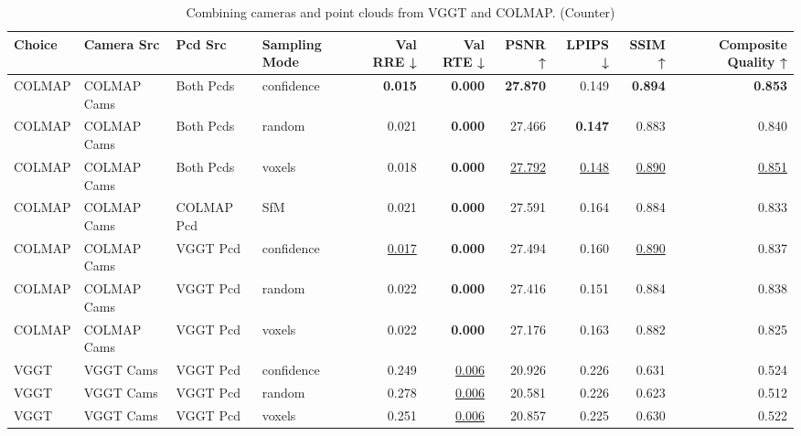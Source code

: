 \begin{table}[H]
\caption{\ifdefined\customcaption \customcaption \else Combining cameras and point clouds from VGGT and COLMAP. (Counter) \fi}
\label{tab:07_combined_single_counter}
\centering
\tiny
\begin{tabular}{llllrrrrrr}
\toprule
Choice & Camera Src & Pcd Src & Sampling Mode & Val RRE ↓ & Val RTE ↓ & PSNR ↑ & LPIPS ↓ & SSIM ↑ & Composite Quality ↑ \\
\midrule
COLMAP & COLMAP Cams & Both Pcds & confidence & \textbf{0.015} & \textbf{0.000} & \textbf{27.870} & 0.149 & \textbf{0.894} & \textbf{0.853} \\
COLMAP & COLMAP Cams & Both Pcds & random & 0.021 & \textbf{0.000} & 27.466 & \textbf{0.147} & 0.883 & 0.840 \\
COLMAP & COLMAP Cams & Both Pcds & voxels & 0.018 & \textbf{0.000} & \underline{27.792} & \underline{0.148} & \underline{0.890} & \underline{0.851} \\
COLMAP & COLMAP Cams & COLMAP Pcd & SfM & 0.021 & \textbf{0.000} & 27.591 & 0.164 & 0.884 & 0.833 \\
COLMAP & COLMAP Cams & VGGT Pcd & confidence & \underline{0.017} & \textbf{0.000} & 27.494 & 0.160 & \underline{0.890} & 0.837 \\
COLMAP & COLMAP Cams & VGGT Pcd & random & 0.022 & \textbf{0.000} & 27.416 & 0.151 & 0.884 & 0.838 \\
COLMAP & COLMAP Cams & VGGT Pcd & voxels & 0.022 & \textbf{0.000} & 27.176 & 0.163 & 0.882 & 0.825 \\
VGGT & VGGT Cams & VGGT Pcd & confidence & 0.249 & \underline{0.006} & 20.926 & 0.226 & 0.631 & 0.524 \\
VGGT & VGGT Cams & VGGT Pcd & random & 0.278 & \underline{0.006} & 20.581 & 0.226 & 0.623 & 0.512 \\
VGGT & VGGT Cams & VGGT Pcd & voxels & 0.251 & \underline{0.006} & 20.857 & 0.225 & 0.630 & 0.522 \\
\bottomrule
\end{tabular}
\end{table}